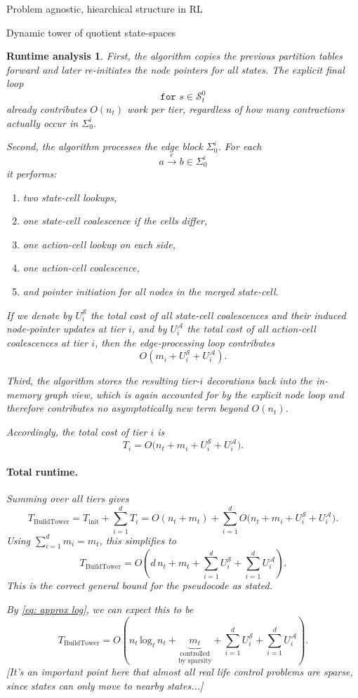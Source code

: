 \documentclass[11pt]{article}
\newtheorem{run_analysis}[subsubsection]{Runtime analysis}
\begin{document}
\begin{section}{Problem agnostic, hiearchical structure in RL}
\begin{subsection}{Dynamic tower of quotient state-spaces}
\begin{run_analysis}
First, the algorithm copies the previous partition tables forward and later re-initiates the node pointers for all states. The explicit final loop
\[
\texttt{for }s\in\mathcal{S}_t^0
\]
already contributes $O(n_t)$ work per tier, regardless of how many contractions actually occur in $\Sigma_0^i$.

Second, the algorithm processes the edge block $\Sigma_0^i$. For each
\[
a\xrightarrow{\ e\ }b\in\Sigma_0^i
\]
it performs:
\begin{enumerate}
    \item two state-cell lookups,
    \item one state-cell coalescence if the cells differ,
    \item one action-cell lookup on each side,
    \item one action-cell coalescence,
    \item and pointer initiation for all nodes in the merged state-cell.
\end{enumerate}
If we denote by
$
U_i^{\mathcal S}
$
the total cost of all state-cell coalescences and their induced node-pointer updates at tier $i$, and by
$
U_i^{\mathcal A}
$
the total cost of all action-cell coalescences at tier $i$, then the edge-processing loop contributes
\[
O(m_i + U_i^{\mathcal S}+U_i^{\mathcal A}).
\]

Third, the algorithm stores the resulting tier-$i$ decorations back into the in-memory graph view, which is again accounted for by the explicit node loop and therefore contributes no asymptotically new term beyond $O(n_t)$.

Accordingly, the total cost of tier $i$ is
\[
T_i = O\bigl(n_t + m_i + U_i^{\mathcal S}+U_i^{\mathcal A}\bigr).
\]

\paragraph{Total runtime.}
Summing over all tiers gives
\[
T_{\mathrm{BuildTower}}
=
T_{\mathrm{init}} + \sum_{i=1}^d T_i
=
O(n_t+m_t)
+
\sum_{i=1}^d O\bigl(n_t + m_i + U_i^{\mathcal S}+U_i^{\mathcal A}\bigr).
\]
Using $\sum_{i=1}^d m_i=m_t$, this simplifies to
\[
T_{\mathrm{BuildTower}}
=
O\!\left(
d\,n_t + m_t + \sum_{i=1}^d U_i^{\mathcal S} + \sum_{i=1}^d U_i^{\mathcal A}
\right).
\]
This is the correct general bound for the pseudocode as stated.

By \eqref{eq: approx log}, we can expect this to be
\[
T_{\mathrm{BuildTower}}
=
O\!\left(
n_t\,\text{log}_{\ell}\,n_{t} + 
\!\!\!\!\!
\underset{\text{by sparsity}}{\underset{\text{controlled}}{\underbrace{m_t}}}
 + \sum_{i=1}^d U_i^{\mathcal S} + \sum_{i=1}^d U_i^{\mathcal A}
\right).
\]
[It's an important point here that almost all real life control problems are sparse, since states can only move to nearby states...]


\end{run_analysis}
\end{subsection}
\end{section}
\end{document}
